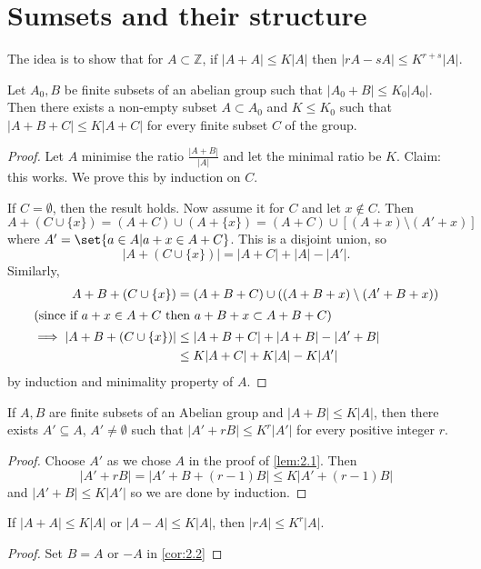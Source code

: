 \documentclass{article}
\newcommand{\1}[1]{\mathbbm{1}_{#1}}
\begin{document}
\clearpage
\section{Sumsets and their structure}
The idea is to show that for $A \subset \mathbb{Z}$, if $|A + A| \leq K|A|$ then $|rA - sA| \leq K^{r+s} |A|$.
\begin{nlemma}[Petridis]\label{lem:2.1}
  Let $A_0, B$ be finite subsets of an abelian group such that $|A_0 + B| \leq K_0 |A_0|$.
  Then there exists a non-empty subset $A \subset A_0$ and $K \leq K_0$ such that $|A + B + C| \leq K|A + C|$ for every finite subset $C$ of the group.
\end{nlemma}
\begin{proof}
  Let $A$ minimise the ratio $\frac{|A+B|}{|A|}$ and let the minimal ratio be $K$.
  Claim: this works. We prove this by induction on $C$.

  If $C = \emptyset$, then the result holds.
  Now assume it for $C$ and let $x \notin C$.
  Then \begin{equation*}A + (C \cup \{x\}) = (A + C) \cup (A + \{x\}) = (A + C) \cup \left[(A + x) \setminus (A' + x)\right]\end{equation*} where $A' = \set{a \in A | a + x \in A + C}$.
  This is a disjoint union, so
  \begin{equation*}
    |A + (C \cup \{x\})| = |A + C| + |A| - |A'|.
  \end{equation*}
  Similarly,
  \begin{align*}
    A + B + (C \cup \{x\}) &= (A + B + C) \cup ((A + B + x) \setminus (A' + B + x)) \\
    \shortintertext{(since if $a+x \in A + C$ then $a + B + x \subset A + B + C$)}
    \implies |A + B + (C \cup \{x\})| &\leq |A + B + C| + |A + B| - |A' + B| \\
                                      &\leq K |A + C| + K|A| - K|A'|
  \end{align*}
  by induction and minimality property of $A$.
\end{proof}
\begin{ncor}\label{cor:2.2}
  If $A,B$ are finite subsets of an Abelian group and $|A + B| \leq K|A|$, then there exists $A' \subseteq A$, $A' \neq \emptyset$ such that $|A' + rB| \leq K^r |A'|$ for every positive integer $r$.
\end{ncor}
\begin{proof}
  Choose $A'$ as we chose $A$ in the proof of \cref{lem:2.1}.
  Then
  \begin{equation*}
    |A' + rB| = |A'+B+(r-1)B| \leq K |A' + (r-1) B|
  \end{equation*}
  and $|A'+B| \leq K|A'|$
  so we are done by induction.
\end{proof}
\begin{ncor}\label{cor:2.3}
  If $|A+A| \leq K|A|$ or $|A - A| \leq K|A|$, then $|rA| \leq K^r |A|$.
\end{ncor}
\begin{proof}
  Set $B = A$ or $-A$ in \cref{cor:2.2}
\end{proof}
\end{document}

